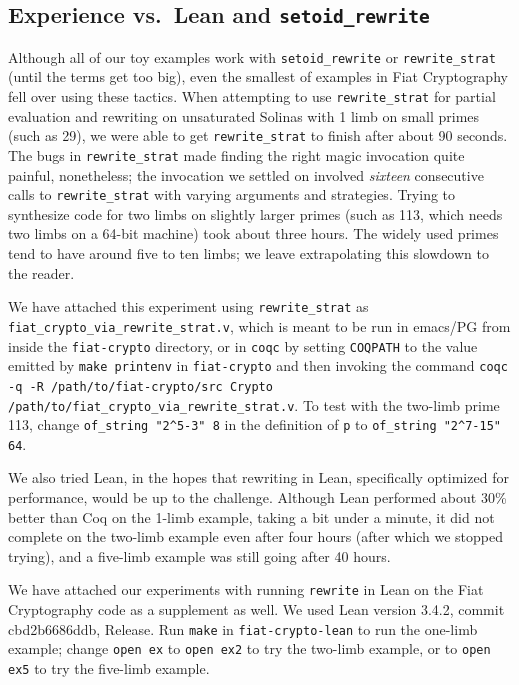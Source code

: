 \begin{subappendices}
\section{Experience vs.\ Lean and \texorpdfstring{\texttt{setoid\protect\_rewrite}}{setoid\_rewrite}}

Although all of our toy examples work with \texttt{setoid\_rewrite} or \texttt{rewrite\_strat} (until the terms get too big), even the smallest of examples in Fiat Cryptography fell over using these tactics.
When attempting to use \texttt{rewrite\_strat} for partial evaluation and rewriting on unsaturated Solinas with 1 limb on small primes (such as 29), we were able to get \texttt{rewrite\_strat} to finish after about 90 seconds.
The bugs in \texttt{rewrite\_strat} made finding the right magic invocation quite painful, nonetheless; the invocation we settled on involved \emph{sixteen} consecutive calls to \texttt{rewrite\_strat} with varying arguments and strategies.
Trying to synthesize code for two limbs on slightly larger primes (such as 113, which needs two limbs on a 64-bit machine) took about three hours.
The widely used primes tend to have around five to ten limbs; we leave extrapolating this slowdown to the reader.

We have attached this experiment using \verb|rewrite_strat| as \verb|fiat_crypto_via_rewrite_strat.v|, which is meant to be run in emacs/PG from inside the \verb|fiat-crypto| directory, or in \verb|coqc| by setting \verb|COQPATH| to the value emitted by \texttt{make printenv} in \verb|fiat-crypto| and then invoking the command \texttt{coqc -q -R /path/to/fiat-crypto/src Crypto /path/to/fiat\_crypto\_via\_rewrite\_strat.v}.
To test with the two-limb prime 113, change \verb|of_string "2^5-3" 8| in the definition of \verb|p| to \verb|of_string "2^7-15" 64|.

We also tried Lean, in the hopes that rewriting in Lean, specifically optimized for performance, would be up to the challenge.
Although Lean performed about 30\% better than Coq on the 1-limb example, taking a bit under a minute, it did not complete on the two-limb example even after four hours (after which we stopped trying), and a five-limb example was still going after 40 hours.

We have attached our experiments with running \texttt{rewrite} in Lean on the Fiat Cryptography code as a supplement as well.
We used Lean version 3.4.2, commit cbd2b6686ddb, Release.
Run \texttt{make} in \texttt{fiat-crypto-lean} to run the one-limb example;
change \texttt{open ex} to \texttt{open ex2} to try the two-limb example, or to \texttt{open ex5} to try the five-limb example.


\end{subappendices}
